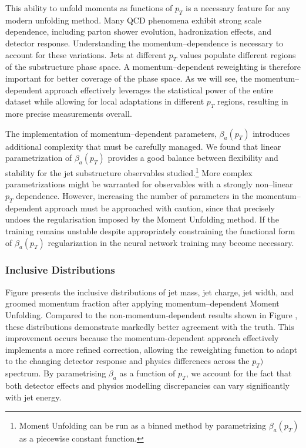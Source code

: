         This ability to unfold moments as functions of \(p_T\) is a necessary feature for any modern unfolding method.
        Many QCD phenomena exhibit strong scale dependence, including parton shower evolution, hadronization effects, and detector response.
        Understanding the momentum--dependence is necessary to account for these variations.
        Jets at different \(p_T\) values populate different regions of the substructure phase space.
        A momentum--dependent reweighting is therefore important for better coverage of the phase space.
        As we will see, the momentum--dependent approach effectively leverages the statistical power of the entire dataset while allowing for local adaptations in different \(p_T\) regions, resulting in more precise measurements overall.

        The implementation of momentum--dependent parameters, \(\beta_a(p_T)\) introduces additional complexity that must be carefully managed.
        We found that linear parametrization of \(\beta_a(p_T)\) provides a good balance between flexibility and stability for the jet substructure observables studied.\footnote{Moment Unfolding can be run as a binned method by parametrizing \(\beta_a(p_T)\) as a piecewise constant function.}
        More complex parametrizations might be warranted for observables with a strongly non--linear \(p_T\) dependence.
        However, increasing the number of parameters in the momentum--dependent approach must be approached with caution, since that precisely undoes the regularisation imposed by the Moment Unfolding method.
        If the training remains unstable despite appropriately constraining the functional form of \(\beta_a(p_T)\) regularization in the neural network training may become necessary.
        
        \subsubsection{Inclusive Distributions}
            Figure  presents the inclusive distributions of jet mass, jet charge, jet width, and groomed momentum fraction after applying momentum--dependent Moment Unfolding.
            Compared to the non-momentum-dependent results shown in Figure , these distributions demonstrate markedly better agreement with the truth.
            This improvement occurs because the momentum-dependent approach effectively implements a more refined correction, allowing the reweighting function to adapt to the changing detector response and physics differences across the \(p_T)\) spectrum.
            By parametrising \(\beta_a\) as a function of \(p_T\), we account for the fact that both detector effects and physics modelling discrepancies can vary significantly with jet energy.

